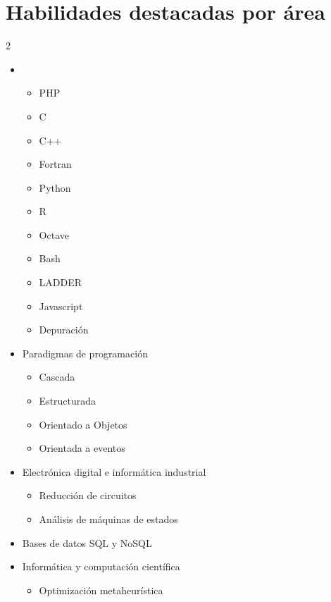 \documentclass[11pt,letterpaper]{article}
\begin{document}
\vspace{1.5em}

\section*{Habilidades destacadas por área}
\begin{multicols}{2}
    \begin{itemize}[leftmargin=*]
        \item \colorbox{vinotinto}{\textcolor{white}{Programación}}
    \begin{itemize}
        \item PHP
        \item C
        \item C++
        \item Fortran
        \item Python
        \item R
        \item Octave
        \item Bash
        \item LADDER
        \item Javascript
        \item Depuración
    \end{itemize}
    \item \colorbox{vinotinto}{\color{white}Paradigmas de programación}
    \begin{itemize}
        \item Cascada
        \item Estructurada
        \item Orientado a Objetos
        \item Orientada a eventos
    \end{itemize}
    \item \colorbox{vinotinto}{\color{white}Electrónica digital e informática industrial}
    \begin{itemize}
        \item Reducción de circuitos
        \item Análisis de máquinas de estados
    \end{itemize}
    \item \colorbox{vinotinto}{\color{white}Bases de datos SQL y NoSQL}
    \item \colorbox{vinotinto}{\color{white}Informática y computación científica}
    \begin{itemize}
        \item Optimización metaheurística

\end{itemize}
\end{itemize}
\end{multicols}
\end{document}
